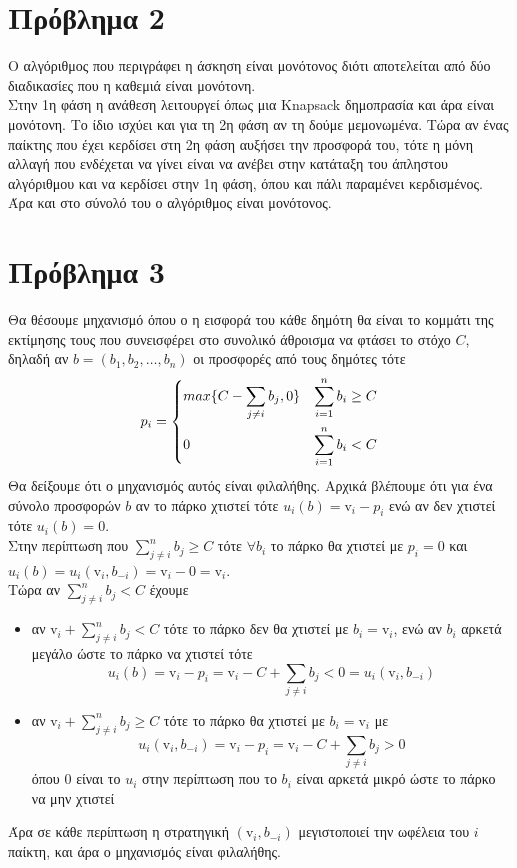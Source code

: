 \documentclass[a4paper,11pt]{article}
\newcommand{\vi}{\mathrm{v}}
\begin{document}
\pagebreak

\section*{Πρόβλημα 2}

Ο αλγόριθμος που περιγράφει η άσκηση είναι μονότονος διότι αποτελείται από δύο διαδικασίες που η καθεμιά είναι μονότονη.
\\[8pt]
Στην 1η φάση η ανάθεση λειτουργεί όπως μια Knapsack δημοπρασία και άρα είναι μονότονη.
Το ίδιο ισχύει και για τη 2η φάση αν τη δούμε μεμονωμένα.
Τώρα αν ένας παίκτης που έχει κερδίσει στη 2η φάση αυξήσει την προσφορά του, τότε η μόνη αλλαγή που ενδέχεται να γίνει είναι να ανέβει στην κατάταξη του άπληστου αλγόριθμου και να κερδίσει στην 1η φάση, όπου και πάλι παραμένει κερδισμένος.
\\[8pt]
Άρα και στο σύνολό του ο αλγόριθμος είναι μονότονος.


\section*{Πρόβλημα 3}

Θα θέσουμε μηχανισμό όπου ο η εισφορά του κάθε δημότη θα είναι το κομμάτι της εκτίμησης τους που συνεισφέρει στο συνολικό άθροισμα να φτάσει το στόχο $C$, δηλαδή αν $b=(b_1,b_2,\dots,b_n)$ οι προσφορές από τους δημότες τότε
\[
	p_i =
	\begin{dcases}
		max\{C-\sum_{j\neq i}b_j,0\} & \sum_{i=1}^n b_i \geq C\\
		0 & \sum_{i=1}^n b_i < C
	\end{dcases}
\]
Θα δείξουμε ότι ο μηχανισμός αυτός είναι φιλαλήθης.
Αρχικά βλέπουμε ότι για ένα σύνολο προσφορών $b$ αν το πάρκο χτιστεί τότε $u_i(b)= \vi_i-p_i$ ενώ αν δεν χτιστεί τότε $u_i(b)=0$.
\\[8pt]
Στην περίπτωση που $\sum_{j\neq i}^n b_j \geq C$ τότε $\forall b_i$ το πάρκο θα χτιστεί με $p_i=0$ και $u_i(b) = u_i(\vi_i,b_{-i}) = \vi_i-0 = \vi_i$.
\\[8pt]
Τώρα αν $\sum_{j\neq i}^n b_j < C$ έχουμε
\begin{itemize}
	\item αν $\vi_i+\sum_{j\neq i}^n b_j < C$ τότε το πάρκο δεν θα χτιστεί με $b_i=\vi_i$, ενώ αν $b_i$ αρκετά μεγάλο ώστε το πάρκο να χτιστεί τότε
		\[u_i(b)=\vi_i-p_i=\vi_i-C+\sum_{j\neq i} b_j < 0 = u_i(\vi_i,b_{-i})\]
	\item αν $\vi_i+\sum_{j\neq i}^n b_j \geq C$ τότε το πάρκο θα χτιστεί με $b_i=\vi_i$ με
		\[u_i(\vi_i,b_{-i}) = \vi_i-p_i = \vi_i-C+\sum_{j\neq i} b_j > 0\]
		όπου $0$ είναι το $u_i$ στην περίπτωση που το $b_i$ είναι αρκετά μικρό ώστε το πάρκο να μην χτιστεί
\end{itemize}
Άρα σε κάθε περίπτωση η στρατηγική $(\vi_i,b_{-i})$ μεγιστοποιεί την ωφέλεια του $i$ παίκτη, και άρα ο μηχανισμός είναι φιλαλήθης.
\end{document}
